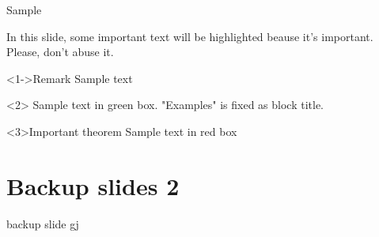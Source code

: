 \begin{frame}[t]{Sample}{}
	
	In this slide, some important text will be
	\alert<2->{highlighted} beause it's important.
	Please, don't abuse it.
	
	\begin{block}<1->{Remark}
	Sample text
	\end{block}
	
	\begin{examples}
	Sample text in green box. "Examples" is fixed as block title.
	\end{examples}
	
	\begin{alertblock}{Important theorem}
	Sample text in red box
	\end{alertblock}
	
\end{frame}

\section{Backup slides 2}

\begin{frame}{backup slide}{}
	gj
	
	\hyperlink{butterfly}{}
	
	\hyperlink{butterfly}{}
	
	\hyperlink{butterfly}{}
	
	\hyperlink{butterfly}{}
\end{frame}

%





